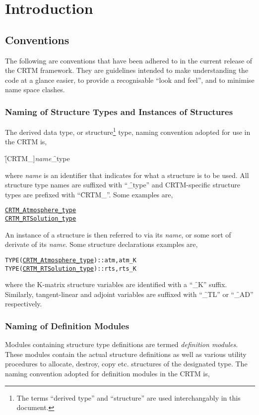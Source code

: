 \chapter{Introduction}

\section{Conventions}
\label{sec:conventions}
The following are conventions that have been adhered to in the current release of the CRTM framework. They are guidelines intended to make understanding the code at a glance easier, to provide a recognisable ``look and feel'', and to minimise name space clashes.

\subsection{Naming of Structure Types and Instances of Structures}
The derived data type, or structure\footnote{The terms ``derived type'' and ``structure'' are used interchangably in this document.} type, naming convention adopted for use in the CRTM is, 

\hspace{0.5cm}\f{[CRTM\_]}\textit{name}\f{\_type} 

where \textit{name} is an identifier that indicates for what a structure is to be used. All structure type names are suffixed with ``\f{\_type}'' and CRTM-specific structure types are prefixed with ``\f{CRTM\_}''. Some examples are,
\begin{alltt}
  \hyperref[sec:atmosphere_structure]{CRTM_Atmosphere_type}
  \hyperref[sec:rtsolution_structure]{CRTM_RTSolution_type}\end{alltt}
An instance of a structure is then referred to via its \textit{name}, or some sort of derivate of its \textit{name}. Some structure declarations examples are,
\begin{alltt}
  TYPE(\hyperref[sec:atmosphere_structure]{CRTM_Atmosphere_type}) :: atm, atm_K
  TYPE(\hyperref[sec:rtsolution_structure]{CRTM_RTSolution_type}) :: rts, rts_K\end{alltt}
where the K-matrix structure variables are identified with a ``\f{\_K}'' suffix. Similarly, tangent-linear and adjoint variables are suffixed with ``\f{\_TL}'' or ``\f{\_AD}'' respectively.

\subsection{Naming of Definition Modules}
Modules containing structure type definitions are termed \textit{definition modules}. These modules contain the actual structure definitions as well as various utility procedures to allocate, destroy, copy etc. structures of the designated type. The naming convention adopted for definition modules in the CRTM is, 


